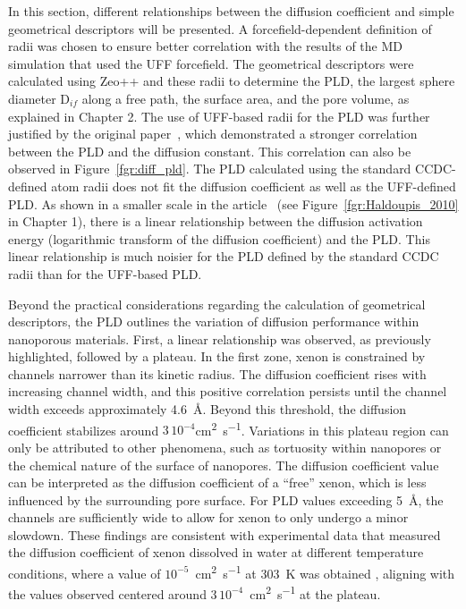 \documentclass[main]{subfiles}
\begin{document}
In this section, different relationships between the diffusion coefficient and simple geometrical descriptors will be presented. A forcefield-dependent definition of radii was chosen to ensure better correlation with the results of the MD simulation that used the UFF forcefield. The geometrical descriptors were calculated using Zeo++ and these radii to determine the PLD, the largest sphere diameter D$_{if}$ along a free path, the surface area, and the pore volume, as explained in Chapter 2. The use of UFF-based radii for the PLD was further justified by the original paper~\cite{Hung_2021}, which demonstrated a stronger correlation between the PLD and the diffusion constant. This correlation can also be observed in Figure~\ref{fgr:diff_pld}. The PLD calculated using the standard CCDC-defined atom radii does not fit the diffusion coefficient as well as the UFF-defined PLD. As shown in a smaller scale in the article~\cite{Haldoupis_2010} (see Figure~\ref{fgr:Haldoupis_2010} in Chapter 1), there is a linear relationship between the diffusion activation energy (logarithmic transform of the diffusion coefficient) and the PLD. This linear relationship is much noisier for the PLD defined by the standard CCDC radii than for the UFF-based PLD.

Beyond the practical considerations regarding the calculation of geometrical descriptors, the PLD outlines the variation of diffusion performance within nanoporous materials. First, a linear relationship was observed, as previously highlighted, followed by a plateau. In the first zone, xenon is constrained by channels narrower than its kinetic radius. The diffusion coefficient rises with increasing channel width, and this positive correlation persists until the channel width exceeds approximately \SI{4.6}{\angstrom}. Beyond this threshold, the diffusion coefficient stabilizes around $3\,10^{-4}$\si{\square\cm\per\s}. Variations in this plateau region can only be attributed to other phenomena, such as tortuosity within nanopores or the chemical nature of the surface of nanopores. The diffusion coefficient value can be interpreted as the diffusion coefficient of a ``free'' xenon, which is less influenced by the surrounding pore surface. For PLD values exceeding \SI{5}{\angstrom}, the channels are sufficiently wide to allow for xenon to only undergo a minor slowdown. These findings are consistent with experimental data that measured the diffusion coefficient of xenon dissolved in water at different temperature conditions, where a value of $10^{-5}$~\si{\square\cm\per\s} at \SI{303}{\kelvin} was obtained \autocite{Wise1968}, aligning with the values observed centered around $3\,10^{-4}$~\si{\square\cm\per\s} at the plateau.
\end{document}
